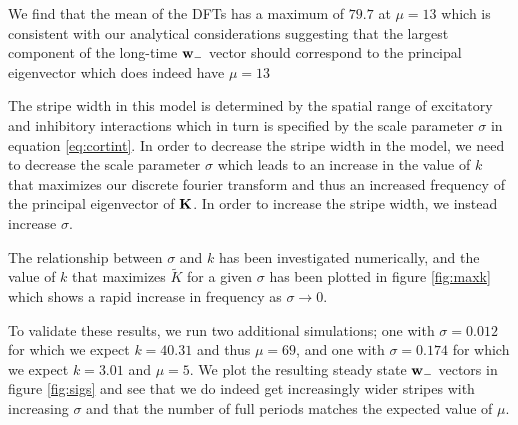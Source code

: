 \documentclass{article}
\begin{document}
We find that the mean of the DFTs has a maximum of $79.7$ at $\mu = 13$ which is consistent with our analytical considerations suggesting that the largest component of the long-time ${\bf w}_-$ vector should correspond to the principal eigenvector which does indeed have $\mu = 13$

The stripe width in this model is determined by the spatial range of excitatory and inhibitory interactions which in turn is specified by the scale parameter $\sigma$ in equation \ref{eq:cortint}.
In order to decrease the stripe width in the model, we need to decrease the scale parameter $\sigma$ which leads to an increase in the value of $k$ that maximizes our discrete fourier transform and thus an increased frequency of the principal eigenvector of $\bf K$. In order to increase the stripe width, we instead increase $\sigma$.

The relationship between $\sigma$ and $k$ has been investigated numerically, and the value of $k$ that maximizes $\tilde K$ for a given $\sigma$ has been plotted in figure \ref{fig:maxk} which shows a rapid increase in frequency as $\sigma \rightarrow 0$.

To validate these results, we run two additional simulations; one with $\sigma = 0.012$ for which we expect $k=40.31$ and thus $\mu = 69$, and one with $\sigma=0.174$ for which we expect $k=3.01$ and $\mu = 5$. We plot the resulting steady state ${\bf w}_-$ vectors in figure \ref{fig:sigs} and see that we do indeed get increasingly wider stripes with increasing $\sigma$ and that the number of full periods matches the expected value of $\mu$.
\end{document}
